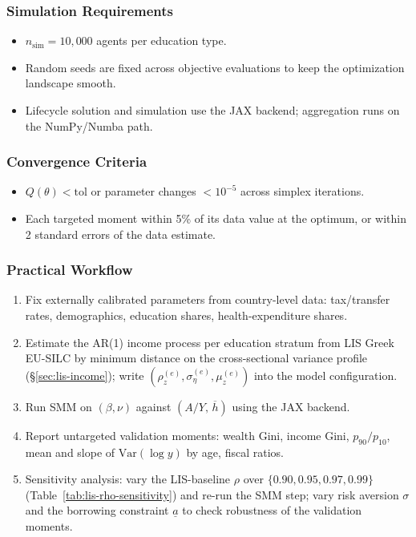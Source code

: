 \subsubsection{Simulation Requirements}

\begin{itemize}[leftmargin=*]
    \item $n_{\text{sim}} = 10{,}000$ agents per education type.
    \item Random seeds are fixed across objective evaluations to keep the optimization landscape smooth.
    \item Lifecycle solution and simulation use the JAX backend; aggregation runs on the NumPy/Numba path.
\end{itemize}

\subsubsection{Convergence Criteria}

\begin{itemize}[leftmargin=*]
    \item $Q(\theta) < \text{tol}$ or parameter changes $< 10^{-5}$ across simplex iterations.
    \item Each targeted moment within 5\% of its data value at the optimum, or within 2 standard errors of the data estimate.
\end{itemize}

\subsubsection{Practical Workflow}

\begin{enumerate}
    \item Fix externally calibrated parameters from country-level data: tax/transfer rates, demographics, education shares, health-expenditure shares.
    \item Estimate the AR(1) income process per education stratum from LIS Greek EU-SILC by minimum distance on the cross-sectional variance profile (\S\ref{sec:lis-income}); write $(\rho_z^{(e)}, \sigma_\eta^{(e)}, \mu_z^{(e)})$ into the model configuration.
    \item Run SMM on $(\beta, \nu)$ against $(A/Y,\, \overline{h})$ using the JAX backend.
    \item Report untargeted validation moments: wealth Gini, income Gini, $p_{90}/p_{10}$, mean and slope of $\mathrm{Var}(\log y)$ by age, fiscal ratios.
    \item Sensitivity analysis: vary the LIS-baseline $\rho$ over $\{0.90, 0.95, 0.97, 0.99\}$ (Table~\ref{tab:lis-rho-sensitivity}) and re-run the SMM step; vary risk aversion $\sigma$ and the borrowing constraint $\underline{a}$ to check robustness of the validation moments.
\end{enumerate}

